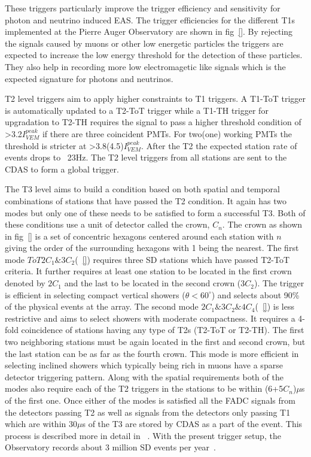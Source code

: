 These triggers particularly improve the trigger efficiency and sensitivity for photon and neutrino induced EAS. The trigger efficiencies for the different T1s implemented at the Pierre Auger Observatory are shown in fig~\ref{}. By rejecting the signals caused by muons or other low energetic particles the triggers are expected to increase the low energy threshold for the detection of these particles. They also help in recording more low electromagetic like signals which is the expected signature for photons and neutrinos. 

T2 level triggers aim to apply higher constraints to T1 triggers. A T1-ToT trigger is automatically updated to a T2-ToT trigger while a T1-TH trigger for upgradation to T2-TH requires the signal to pass a higher threshold condition of >3.2$I_{VEM}^{peak}$ if there are three coincident PMTs. For two(one) working PMTs the threshold is stricter at >3.8(4.5)$I_{VEM}^{peak}$. After the T2 the expected station rate of events drops to ~23Hz. The T2 level triggers from all stations are sent to the CDAS to form a global trigger.

The T3 level aims to build a condition based on both spatial and temporal combinations of stations that have passed the T2 condition. It again has two modes but only one of these needs to be satisfied to form a successful T3. Both of these conditions use a unit of detector called the crown, $C_n$. The crown as shown in fig~\ref{} is a set of concentric hexagons centered around each station with $n$ giving the order of the surrounding hexagons with 1 being the nearest. The first mode $ToT2C_1\&3C_2$(~\ref{}) requires three SD stations which have passed T2-ToT criteria. It further requires at least one station to be located in the first crown denoted by $2C_1$ and the last to be located in the second crown ($3C_2$). The trigger is efficient in selecting compact vertical showers ($\theta < 60^{\circ}$) and selects about 90\% of the physical events at the array. The second mode $2C_1\&3C_2\&4C_4$(~\ref{}) is less restrictive and aims to select showers with moderate compactness. It requires a 4-fold coincidence of stations having any type of T2s (T2-ToT or T2-TH). The first two neighboring stations must be again located in the first and second crown, but the last station can be as far as the fourth crown. This mode is more efficient in selecting inclined showers which typically being rich in muons have a sparse detector triggering pattern. Along with the spatial requirements both of the modes also require each of the T2 triggers in the stations to be within (6+5$C_n$)$\mu$s of the first one. Once either of the modes is satisfied all the FADC signals from the detectors passing T2 as well as signals from the detectors only passing T1 which are within 30$\mu$s of the T3 are stored by CDAS as a part of the event. This process is described more in detail in ~\cite{}. With the present trigger setup, the Observatory records about 3 million SD events per year~\cite{}. 


